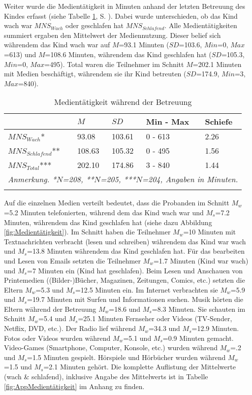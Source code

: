 Weiter wurde die Medientätigkeit in Minuten anhand der letzten Betreuung des Kindes erfasst (siehe Tabelle \ref{table:Medientätigkeit}, S. \pageref{table:Medientätigkeit}). Dabei wurde unterschieden, ob das Kind wach war $MNS_{Wach}$ oder geschlafen hat $MNS_{Schlafend}$. Alle Medientätigkeiten summiert ergaben den Mittelwert der Mediennutzung. Dieser belief sich währendem das Kind wach war auf $M$=93.1 Minuten ($SD$=103.6, $Min$=0, $Max$=613) und $M$=108.6 Minuten, währendem das Kind geschlafen hat ($SD$=105.3, $Min$=0, $Max$=495). Total waren die Teilnehmer im Schnitt $M$=202.1 Minuten mit Medien beschäftigt, währendem sie ihr Kind betreuten ($SD$=174.9, $Min$=3, $Max$=840).

\begin{table}[b]
\begin{tabular}{m{8em} m{4em}  m{4em}  m{5em} m{4em}} 
  \hline
  & $M$ & $SD$ & Min - Max & Schiefe\\
  \hline
  $MNS_{Wach}$* & 93.08 & 103.61 & 0 - 613 & 2.26\\
  $MNS_{Schlafend}$** & 108.63 & 105.32 & 0 - 495 & 1.56\\
  $MNS_{Total}$*** & 202.10 & 174.86 & 3 - 840 & 1.44 \\
  \hline
  \multicolumn{5}{l}{\textit{Anmerkung. *$N$=208, **$N$=205, ***$N$=204, Angaben in Minuten.}}\\
  &&&&\\
\end{tabular}
\caption{Medientätigkeit während der Betreuung}
\label{table:Medientätigkeit}
\end{table}

Auf die einzelnen Medien verteilt bedeutet, dass die Probanden im Schnitt $M_{w}$=5.2 Minuten telefonierten, während dem das Kind wach war und $M_{s}$=7.2 Minuten, währendem das Kind geschlafen hat (siehe dazu Abbildung \ref{fig:Medientätigkeit}). Im Schnitt haben die Teilnehmer $M_{w}$=10 Minuten mit Textnachrichten verbracht (lesen und schreiben) währendem das Kind war wach und $M_{s}$=13.8 Minuten währendem das Kind geschlafen hat. Für das bearbeiten und Lesen von Emails setzten die Teilnehmer $M_{w}$=1.7 Minuten (Kind war wach) und $M_{s}$=7 Minuten ein (Kind hat geschlafen). Beim Lesen und Anschauen von Printemedien ((Bilder-)Bücher, Magazinen, Zeitungen, Comics, etc.) setzten die Eltern $M_{w}$=5.3 und $M_{s}$=12.5 Minuten ein. Im Internet verbrachten sie $M_{w}$=5.9 und $M_{s}$=19.7 Minuten mit Surfen und Informationen suchen. Musik hörten die Eltern während der Betreuung $M_{w}$=18.6 und $M_{s}$=8.3 Minuten. Sie schauten im Schnitt $M_{w}$=5.4 und $M_{s}$=25.1 Minuten Fernseher oder Videos (TV-Sender, Netflix, DVD, etc.). Der Radio lief während $M_{w}$=34.3 und $M_{s}$=12.9 Minuten. Fotos oder Videos wurden während $M_{w}$=5.1 und $M_{s}$=0.9 Minuten gemacht. Video-Games (Smartphone, Computer, Konsole, etc.) wurden während $M_{w}$=.2 und $M_{s}$=1.5 Minuten gespielt. Hörspiele und Hörbücher wurden während $M_{w}$=1.5 und $M_{s}$=2.1 Minuten gehört. Die komplette Auflistung der Mittelwerte (wach \& schlafend), inklusive Angabe des  Mittelwerts ist in Tabelle \ref{fig:AppMedientätigkeit} im Anhang zu finden.

